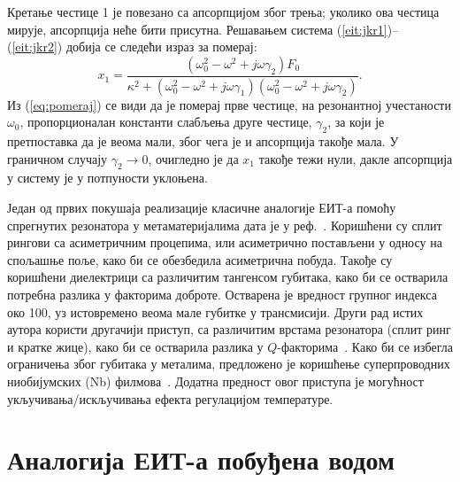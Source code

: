 \documentclass[main.tex]{subfiles}
\begin{document}
Кретање честице 1 је повезано са апсорпцијом због трења; уколико ова честица мирује, апсорпција неће бити присутна. Решавањем система (\ref{eit:jkr1})–(\ref{eit:jkr2}) добија се следећи израз за померај:
\begin{equation}
    \label{eq:pomeraj}
    x_1 = \frac{\left( \omega_0^2 - \omega^2 + j\omega\gamma_2 \right)F_0}{\kappa^2 + \left( \omega_0^2 - \omega^2 + j\omega\gamma_1 \right) \left( \omega_0^2 - \omega^2 + j\omega\gamma_2   \right)}.
\end{equation}
Из (\ref{eq:pomeraj}) се види да је померај прве честице, на резонантној учестаности $\omega_0$, пропорционалан константи слабљења друге честице, $\gamma_2$, за који је претпоставка да је веома мали, због чега је и апсорпција такође мала. У граничном случају $\gamma_2\to 0$, очигледно је да $x_1$ такође тежи нули, дакле апсорпција у систему је у потпуности уклоњена.

Један од првих покушаја реализације класичне аналогије ЕИТ-а помоћу спрегнутих резонатора у метаматеријалима дата је у реф.~\cite{tassin:09}. Коришћени су сплит рингови са асиметричним процепима, или асиметрично постављени у односу на спољашње поље, како би се обезбедила асиметрична побуда. Такође су коришћени диелектрици са различитим тангенсом губитака, како би се остварила потребна разлика у факторима доброте. Остварена је вредност групног индекса око 100, уз истовремено веома мале губитке у трансмисији. Други рад истих аутора користи другачији приступ, са различитим врстама резонатора (сплит ринг и кратке жице), како би се остварила разлика у $Q$-факторима~\cite{tassin2009planar}. Како би се избегла ограничења због губитака у металима, предложено је коришћење суперпроводних ниобијумских (Nb) филмова~\cite{cihan}. Додатна предност овог приступа је могућност укључивања/искључивања ефекта регулацијом температуре.

\section{Аналогија ЕИТ-а побуђена водом}%
\label{sec:analogija_eit_a_pobudjena_vodom}
\end{document}
